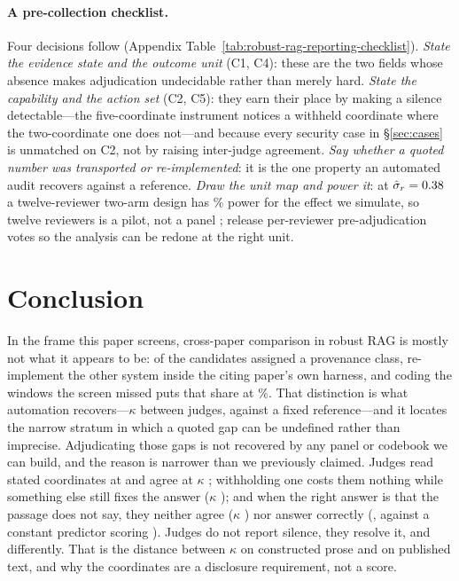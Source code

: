 \documentclass[11pt]{article}
\begin{document}
\paragraph{A pre-collection checklist.}
Four decisions follow (Appendix
Table~\ref{tab:robust-rag-reporting-checklist}). \emph{State the evidence state
and the outcome unit} (C1, C4): these are the two fields whose absence makes
adjudication undecidable rather than merely hard. \emph{State the capability and
the action set} (C2, C5): they earn their place by making a silence
detectable---the five-coordinate instrument notices a withheld coordinate where
the two-coordinate one does not---and because every security case in
\S\ref{sec:cases} is unmatched on C2, not by raising inter-judge agreement.
\emph{Say whether a quoted number was transported or re-implemented}: it is the
one property an automated audit recovers against a reference. \emph{Draw the
unit map and power it}: at $\hat\sigma_r=0.38{}$ a twelve-reviewer
two-arm design has \SimTwelvePower\% power for the effect we simulate, so twelve
reviewers is a pilot, not a panel \citep{card2020power}; release per-reviewer
pre-adjudication votes so the analysis can be redone at the right unit.

\section{Conclusion}

In the frame this paper screens, cross-paper comparison in robust RAG is mostly
not what it appears to be: of the \ProvClassified{} candidates assigned a
provenance class, \ProvReimplemented{} re-implement the other system inside the
citing paper's own harness, and coding the windows the screen missed puts that
share at \RecUniverseShare\%. That distinction is what automation
recovers---$\kappa$ \DecProvK{} between judges, \PvAcc{} against a fixed
reference---and it locates the narrow stratum in which a quoted gap can be
undefined rather than imprecise. Adjudicating those gaps is not
recovered by any panel or codebook we can build, and the reason is narrower than
we previously claimed. Judges read stated coordinates at \InsFullCoord{} and
agree at $\kappa$ \InsFullK{}; withholding one costs them nothing while
something else still fixes the answer ($\kappa$ \InsBalK{}); and when the right
answer is that the passage does not say, they neither agree ($\kappa$
\InsForceK{}) nor answer correctly (\InsForceJudge{}, against a constant
predictor scoring \InsForceBase{}). Judges do not report silence, they resolve
it, and differently. That is the distance between $\kappa$ \InsFullK{} on
constructed prose and \DecVerdictK{} on published text, and why the coordinates
are a disclosure requirement, not a score.
\end{document}
